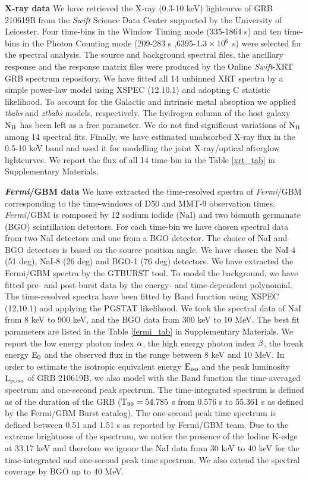 \documentclass{naturesubmissionstyle}
\begin{document}
{\noindent \bf  X-ray data}
We have retrieved the X-ray (0.3-10 keV) lightcurve of GRB 210619B from the {\it Swift} Science Data Center supported by the University of Leicester\cite{Evans2009}. Four time-bins in the Window Timing mode (335-1864 s) and ten time-bins in the Photon Counting mode (209-283 s ,6395-$\rm 1.3\times10^{6}$ s) were selected for the spectral analysis. The source and background spectral files, the ancillary response and the response matrix files were produced by the Online {\it Swift}-XRT GRB spectrum repository\cite{Evans2009}. We have fitted all 14 unbinned XRT spectra by a simple power-law model using XSPEC (12.10.1) and 
adopting C statistic likelihood. To account for the Galactic\cite{Kalberla2005} and intrinsic metal absoption we applied {\it tbabs} and {\it ztbabs} models, respectively. The hydrogen column of the host galaxy $\rm N_{H}$ has been left as a free parameter. We do not find significant variations of $\rm N_{H}$ among 14 spectral fits. Finally, we have estimated unabsorbed X-ray flux in the 0.5-10 keV band and used it for modelling the joint X-ray/optical afterglow lightcurves. We report the flux of all 14 time-bin in the Table \ref{xrt_tab} in Supplementary Materials.   

{\noindent \bf  \textit{Fermi}/GBM data}
We have extracted the time-resolved spectra of \textit{Fermi}/GBM corresponding to the time-windows of D50 and MMT-9 observation times. \textit{Fermi}/GBM is composed by 12 sodium iodide (NaI) and two bismuth germanate (BGO) scintillation detectors\cite{Meegan2009}. For each time-bin we have chosen spectral data from two NaI detectors and one from a BGO detector. The choice of NaI and BGO detectors is based on the source position angle. We have chosen the NaI-4 (51 deg), NaI-8 (26 deg) and BGO-1 (76 deg) detectors. We have extracted the Fermi/GBM spectra by the GTBURST tool. To model the background, we have fitted pre- and post-burst data by the energy- and time-dependent polynomial. The time-resolved spectra have been fitted by Band function\cite{Band1993} using XSPEC (12.10.1) and applying the PGSTAT likelihood. We took the spectral data of NaI from 8 keV to 900 keV, and the BGO data from 300 keV to 10 MeV. The best fit parameters are listed in the Table \ref{fermi_tab} in Supplementary Materials. We report the low energy photon index $\rm \alpha$, the high energy photon index $\rm \beta$, the break energy $\rm E_{0}$ and the observed flux in the range between 8 keV and 10 MeV. 
In order to estimate the isotropic equivalent energy $\rm E_{iso}$ and the peak luminosity $\rm L_{p,iso}$ of GRB 210619B, we also model with the Band function the time-averaged spectrum and one-second peak spectrum. The time-integrated spectrum is defined as of the duration of the GRB ($\rm T_{90}=54.785$ s from 0.576 s to 55.361 s as defined by the Fermi/GBM Burst catalog). The one-second peak time spectrum is defined between 0.51 and 1.51 s as reported by Fermi/GBM team\cite{gcn_fermi}. Due to the extreme brightness of the spectrum, we notice the presence of the Iodine K-edge at 33.17 keV\cite{Meegan2009} and therefore we ignore the NaI data from 30 keV to 40 keV for the time-integrated and one-second peak time spectrum. We also extend the spectral coverage by BGO up to 40 MeV. 
\end{document}
